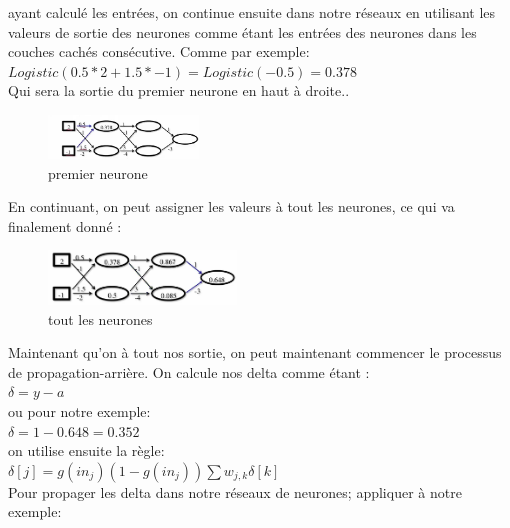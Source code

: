 \documentclass[oneside]{book}
\begin{document}
\justify
ayant calculé les entrées, on continue ensuite dans notre réseaux en utilisant les valeurs de sortie des neurones comme étant les entrées des neurones dans les couches cachés consécutive. Comme par exemple:\\

\centering
$Logistic(0.5*2 + 1.5*-1) = Logistic(-0.5) = 0.378$\\

Qui sera la sortie du premier neurone en haut à droite..\\

\begin{figure}[!ht]
\centering
\includegraphics[width = 4cm]{exemple_backprop1.png}
\caption{premier neurone}
\label{fig:backprop1}
\end{figure}

En continuant, on peut assigner les valeurs à tout les neurones, ce qui va finalement donné : \\

\begin{figure}
\centering
\includegraphics[width = 5cm]{exemple_backprop2.png}
\caption{tout les neurones}
\label{fig:backprop2}
\end{figure}

\justify
Maintenant qu'on à tout nos sortie, on peut maintenant commencer le processus de propagation-arrière. On calcule nos delta comme étant :\\
\centering
$\delta = y - a$\\

ou pour notre exemple:\\

$\delta = 1 - 0.648 = 0.352$\\

on utilise ensuite la règle:\\

$\delta [j] = g(in_j)(1-g(in_j)) \sum\limits w_{j,k} \delta [k]$\\

Pour propager les delta dans notre réseaux de neurones; appliquer à notre exemple:\\
\end{document}
